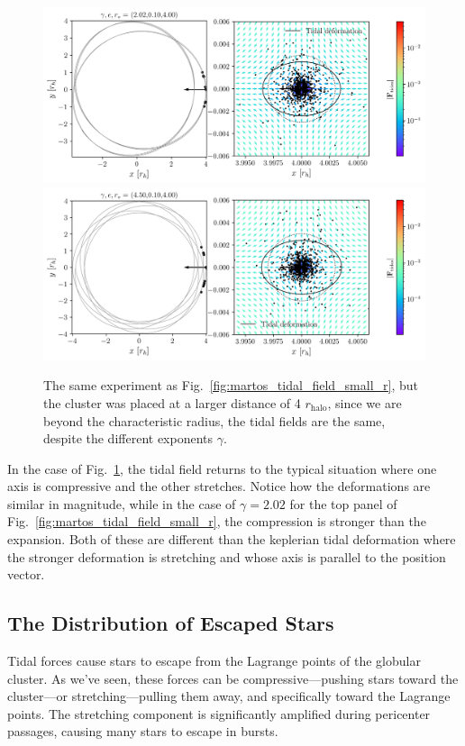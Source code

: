             \begin{figure}
                \includegraphics[width=\linewidth]{images/martos_tidal_field_202_10_400.png}
                \includegraphics[width=\linewidth]{images/martos_tidal_field_450_10_400.png}
                \caption{The same experiment as Fig.~\ref{fig:martos_tidal_field_small_r}, but the cluster was placed at a larger distance of 4 $r_\textrm{halo}$, since we are beyond the characteristic radius, the tidal fields are the same, despite the different exponents $\gamma$.}
                \label{fig:martos_tidal_field_big_r}
            \end{figure}
            In the case of Fig.~\ref{fig:martos_tidal_field_big_r}, the tidal field returns to the typical situation where one axis is compressive and the other stretches. Notice how the deformations are similar in magnitude, while in the case of $\gamma=2.02$ for the top panel of Fig.~\ref{fig:martos_tidal_field_small_r}, the compression is stronger than the expansion. Both of these are different than the keplerian tidal deformation where the stronger deformation is stretching and whose axis is parallel to the position vector. 

    \subsection{The Distribution of Escaped Stars}\label{sec:phaseMixing}
        Tidal forces cause stars to escape from the Lagrange points of the globular cluster. As we've seen, these forces can be compressive—pushing stars toward the cluster—or stretching—pulling them away, and specifically toward the Lagrange points. The stretching component is significantly amplified during pericenter passages, causing many stars to escape in bursts.

